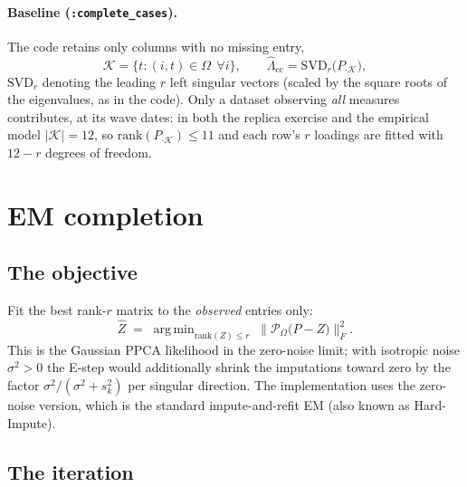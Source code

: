 \documentclass[11pt]{article}
\newcommand{\code}[1]{\texttt{#1}}
\newcommand{\SVD}{\mathrm{SVD}}
\DeclareMathOperator*{\argmin}{arg\,min}
\begin{document}
\paragraph{Baseline (\code{:complete\_cases}).} The code retains only columns
with no missing entry,
\begin{equation}
  \mathcal{K} = \bigl\{ t : (i,t) \in \Omega \ \ \forall i \bigr\},
  \qquad
  \hat\Lambda_{\mathrm{cc}} = \SVD_r\bigl( P_{\cdot\mathcal{K}} \bigr),
\end{equation}
$\SVD_r$ denoting the leading $r$ left singular vectors (scaled by the square
roots of the eigenvalues, as in the code). Only a dataset observing \emph{all}
measures contributes, at its wave dates: in both the replica exercise and the
empirical model $|\mathcal{K}| = 12$, so $\mathrm{rank}(P_{\cdot\mathcal{K}})
\le 11$ and each row's $r$ loadings are fitted with $12 - r$ degrees of freedom.

\section{EM completion}

\subsection{The objective}

Fit the best rank-$r$ matrix to the \emph{observed} entries only:
\begin{equation}
  \hat Z \;=\; \argmin_{\mathrm{rank}(Z)\le r}\;
  \bigl\| \mathcal{P}_\Omega\bigl(P - Z\bigr) \bigr\|_F^2 .
  \label{eq:objective}
\end{equation}
This is the Gaussian PPCA likelihood in the zero-noise limit; with isotropic
noise $\sigma^2 > 0$ the E-step would additionally shrink the imputations
toward zero by the factor $\sigma^2/(\sigma^2 + s_k^2)$ per singular direction.
The implementation uses the zero-noise version, which is the standard
impute-and-refit EM (also known as Hard-Impute).

\subsection{The iteration}
\end{document}
